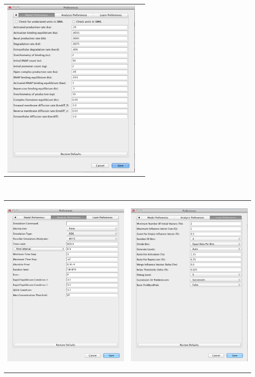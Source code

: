 \documentclass[titlepage,11pt]{article}
\begin{document}
\begin{center}
\begin{tabular}{cc}
\includegraphics[height=90mm]{screenshots/ModelPref}
\end{tabular} \\
\begin{tabular}{cc}
\includegraphics[height=90mm]{screenshots/AnaPref} &
\includegraphics[height=90mm]{screenshots/LearnPref}
\end{tabular}
\end{center}
\end{document}
